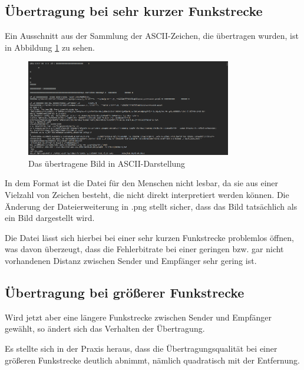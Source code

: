 \subsection{Übertragung bei sehr kurzer Funkstrecke}
Ein Ausschnitt aus der Sammlung der ASCII-Zeichen, die übertragen wurden, ist in Abbildung \ref{fig:Task2c} zu sehen.

\begin{figure}[H]
    \centering
    \includegraphics[width=0.8\textwidth]{Pictures/memeASCII.png}
    \caption{Das übertragene Bild in ASCII-Darstellung}
    \label{fig:Task2c}
\end{figure}

In dem Format ist die Datei für den Menschen nicht lesbar, da sie aus einer Vielzahl von Zeichen besteht, die nicht direkt interpretiert werden können. 
Die Änderung der Dateierweiterung in .png stellt sicher, dass das Bild tatsächlich als ein Bild dargestellt wird. 

Die Datei lässt sich hierbei bei einer sehr kurzen Funkstrecke problemlos öffnen, was davon überzeugt, dass die Fehlerbitrate bei einer geringen bzw. gar nicht vorhandenen Distanz zwischen Sender und Empfänger sehr gering ist.

\subsection{Übertragung bei größerer Funkstrecke}
Wird jetzt aber eine längere Funkstrecke zwischen Sender und Empfänger gewählt, so ändert sich das Verhalten der Übertragung. 

Es stellte sich in der Praxis heraus, dass die Übertragungsqualität bei einer größeren Funkstrecke deutlich abnimmt, nämlich quadratisch mit der Entfernung.

